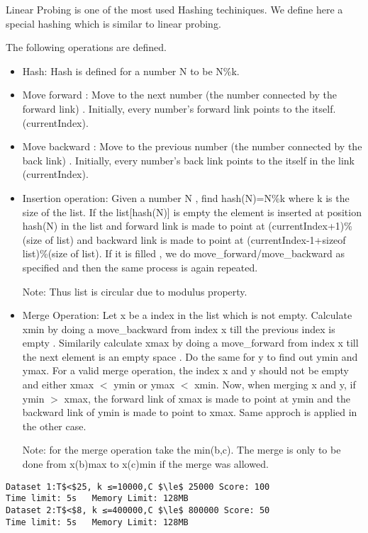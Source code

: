 Linear Probing is one of the most used Hashing techiniques. We define here a special hashing which is similar to linear probing.  

   The following operations are defined.  
\begin{itemize}
	\item     Hash: Hash is defined for a number N to be N\%k.   
	\item     Move forward : Move to the next number (the number connected by the forward link) . Initially, every number's forward link points to the itself. (currentIndex).   
	\item     Move backward : Move to the previous number (the number connected by the back link) . Initially, every number's back link points to the itself in the link (currentIndex).   
	\item     Insertion operation: Given a number N , find hash(N)=N\%k where k is the size of the list. If the list[hash(N)] is empty the element is inserted at position hash(N) in the list and forward link is made to point at (currentIndex+1)\%(size of list) and backward link is made to point at (currentIndex-1+sizeof list)\%(size of list). If it is filled , we do move\_forward/move\_backward as specified and then the same process is again repeated.   

    Note: Thus list is circular due to modulus property.   
	\item     Merge Operation: Let x be a index in the list which is not empty. Calculate xmin by doing a move\_backward from index x till the previous index is empty . Similarily calculate xmax by doing a move\_forward from index x till the next element is an empty space . Do the same for y to find out ymin and ymax. For a valid merge operation, the index x and y should not be empty and either xmax $<$ ymin or ymax $<$ xmin. Now, when merging x and y, if ymin $>$ xmax, the forward link of xmax is made to point at ymin and the backward link of ymin is made to point to xmax. Same approch is applied in the other case.   

    Note: for the merge operation take the min(b,c). The merge is only to be done from x(b)max to x(c)min if the merge was allowed.   
\end{itemize}

\begin{verbatim}
Dataset 1:T$<$25, k ≤=10000,C $\le$ 25000 Score: 100
Time limit: 5s   Memory Limit: 128MB
Dataset 2:T$<$8, k ≤=400000,C $\le$ 800000 Score: 50
Time limit: 5s   Memory Limit: 128MB 
\end{verbatim}
